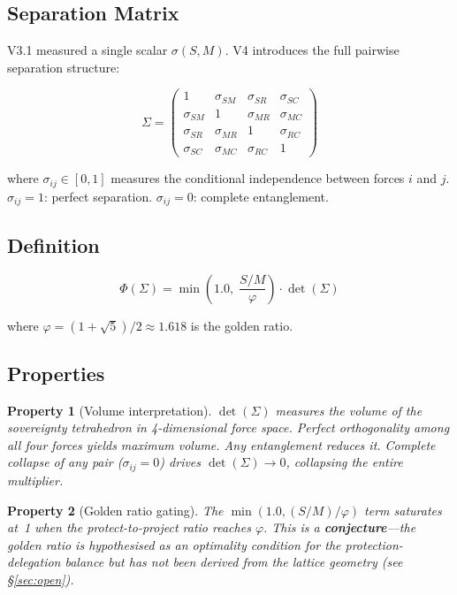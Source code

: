 \documentclass[11pt,a4paper]{article}
\newtheorem{property}{Property}[section]
\begin{document}
\subsection{Separation Matrix}

V3.1 measured a single scalar $\sigma(S,M)$. V4 introduces the full pairwise separation structure:

\begin{equation}\label{eq:sigma}
\Sigma = \begin{pmatrix}
1 & \sigma_{SM} & \sigma_{SR} & \sigma_{SC} \\
\sigma_{SM} & 1 & \sigma_{MR} & \sigma_{MC} \\
\sigma_{SR} & \sigma_{MR} & 1 & \sigma_{RC} \\
\sigma_{SC} & \sigma_{MC} & \sigma_{RC} & 1
\end{pmatrix}
\end{equation}

\noindent where $\sigma_{ij} \in [0,1]$ measures the conditional independence between forces $i$ and $j$. $\sigma_{ij} = 1$: perfect separation. $\sigma_{ij} = 0$: complete entanglement.

\subsection{Definition}

\begin{equation}\label{eq:phi}
\Phi(\Sigma) = \min\!\left(1.0,\; \frac{S/M}{\varphi}\right) \cdot \det(\Sigma)
\end{equation}

\noindent where $\varphi = (1+\sqrt{5})/2 \approx 1.618$ is the golden ratio.

\subsection{Properties}

\begin{property}[Volume interpretation]
$\det(\Sigma)$ measures the volume of the sovereignty tetrahedron in 4-dimensional force space. Perfect orthogonality among all four forces yields maximum volume. Any entanglement reduces it. Complete collapse of any pair ($\sigma_{ij} = 0$) drives $\det(\Sigma) \to 0$, collapsing the entire multiplier.
\end{property}

\begin{property}[Golden ratio gating]
The $\min(1.0, (S/M)/\varphi)$ term saturates at~1 when the protect-to-project ratio reaches $\varphi$. This is a \textbf{conjecture}---the golden ratio is hypothesised as an optimality condition for the protection-delegation balance but has not been derived from the lattice geometry (see \S\ref{sec:open}).
\end{property}
\end{document}
